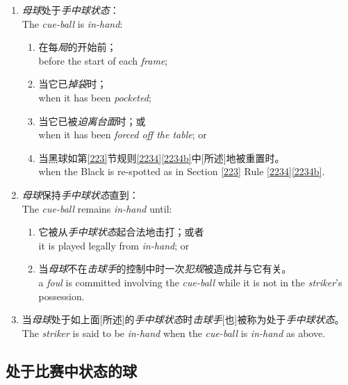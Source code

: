 \begin{enumerate}[label=(\alph*)]
    \item \textit{母球}处于\textit{手中球状态}：\\
    The \textit{cue-ball} is \textit{in-hand}:
    \begin{enumerate}[label=(\roman*)]
        \item 在每\textit{局}的开始前；\\
        before the start of each \textit{frame};
        \item 当它已\textit{掉袋}时；\\
        when it has been \textit{pocketed};
        \item 当它已被\textit{迫离台面}时；或\\
        when it has been \textit{forced off the table}; or
        \item 当黑球如第\ref{223}节规则\ref{2234}\ref{2234b}中[所述]地被重置时。\\
        when the Black is re-spotted as in Section \ref{223} Rule \ref{2234}\ref{2234b}.
    \end{enumerate}
    \item \textit{母球}保持\textit{手中球状态}直到：\\
    The \textit{cue-ball} remains \textit{in-hand} until:
    \begin{enumerate}[label=(\roman*)]
        \item 它被从\textit{手中球状态}起合法地击打；或者\\
        it is played legally from \textit{in-hand}; or
        \item 当\textit{母球}不在\textit{击球手}的控制中时一次\textit{犯规}被造成并与它有关。\\
        a \textit{foul} is committed involving the \textit{cue-ball} while it is not in the \textit{striker}'s possession.
    \end{enumerate}
    \item 当\textit{母球}处于如上面[所述]的\textit{手中球状态}时\textit{击球手}[也]被称为处于\textit{手中球状态}。\\
    The \textit{striker} is said to be \textit{in-hand} when the \textit{cue-ball} is \textit{in-hand} as above.
\end{enumerate}

\subsection{处于比赛中状态的球}

